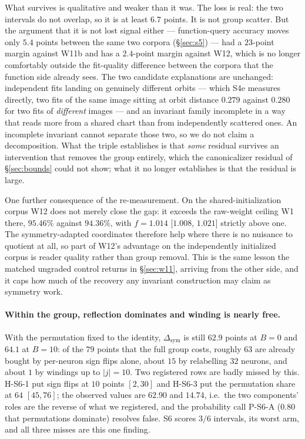 \documentclass[10pt,letterpaper]{article}
\theoremstyle{definition}
\begin{document}
What survives is qualitative and weaker than it was. The loss is real: the two intervals do not
overlap, so it is at least $6.7$ points. It is not group scatter. But the argument that it is not
lost signal either --- function-query accuracy moves only $5.4$ points between the same two corpora
(\S\ref{sec:s5}) --- had a $23$-point margin against W11b and has a $2.4$-point margin against W12,
which is no longer comfortably outside the fit-quality difference between the corpora that the
function side already sees. The two candidate explanations are unchanged: independent fits landing
on genuinely different orbits --- which S4e measures directly, two fits of the same image sitting at
orbit distance $0.279$ against $0.280$ for two fits of \emph{different} images --- and an invariant
family incomplete in a way that reads more from a shared chart than from independently scattered
ones. An incomplete invariant cannot separate those two, so we do not claim a decomposition. What
the triple establishes is that \emph{some} residual survives an intervention that removes the group
entirely, which the canonicalizer residual of \S\ref{sec:bounds} could not show; what it no longer
establishes is that the residual is large.

One further consequence of the re-measurement. On the shared-initialization corpus W12 does not
merely close the gap: it exceeds the raw-weight ceiling W1 there, $95.46\%$ against $94.36\%$, with
$f = 1.014$ [$1.008$, $1.021$] strictly above one. The symmetry-adapted coordinates therefore help
where there is no nuisance to quotient at all, so part of W12's advantage on the independently
initialized corpus is reader quality rather than group removal. This is the same lesson the matched ungraded control
returns in \S\ref{sec:w11}, arriving from the other side, and it caps how much of the recovery any
invariant construction may claim as symmetry work.

\paragraph{Within the group, reflection dominates and winding is nearly free.} With the permutation
fixed to the identity, $\Delta_{\mathrm{sym}}$ is still $62.9$ points at $B=0$ and $64.1$ at
$B=10$: of the $79$ points that the full group costs, roughly $63$ are already bought by
per-neuron sign flips alone, about $15$ by relabelling $32$ neurons, and about $1$ by windings up
to $|j|=10$. Two registered rows are badly missed by this. H-S6-1 put sign flips at $10$ points
$[2,30]$ and H-S6-3 put the permutation share at $64$ $[45,76]$; the observed values are $62.90$ and
$14.74$, i.e.\ the two components' roles are the reverse of what we registered, and the probability
call P-S6-A ($0.80$ that permutations dominate) resolves false. S6 scores $3/6$ intervals, its worst
arm, and all three misses are this one finding.
\end{document}
